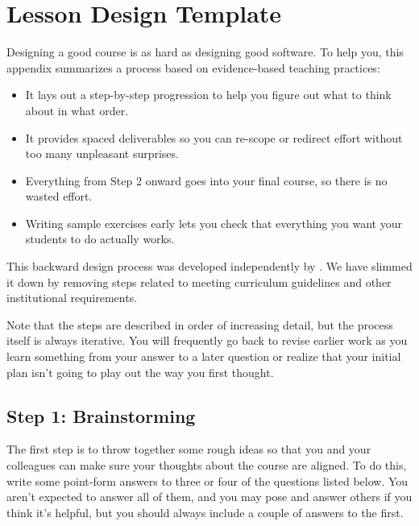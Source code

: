 \chapter{Lesson Design Template}\label{s:template}

Designing a good course is as hard as designing good software. To help
you, this appendix summarizes a process based on evidence-based teaching
practices:

\begin{itemize}

\item
  It lays out a step-by-step progression to help you figure out what to
  think about in what order.

\item
  It provides spaced deliverables so you can re-scope or redirect
  effort without too many unpleasant surprises.

\item
  Everything from Step 2 onward goes into your final course, so there is
  no wasted effort.

\item
  Writing sample exercises early lets you check that everything you want
  your students to do actually works.

\end{itemize}

This backward design process was developed independently by
\cite{Wigg2005,Bigg2011,Fink2013}. We have slimmed it down by
removing steps related to meeting curriculum guidelines and other
institutional requirements.

Note that the steps are described in order of increasing detail, but
the process itself is always iterative. You will frequently go back to
revise earlier work as you learn something from your answer to a later
question or realize that your initial plan isn't going to play out the
way you first thought.

\section*{Step 1: Brainstorming}

The first step is to throw together some rough ideas so that you and
your colleagues can make sure your thoughts about the course are
aligned. To do this, write some point-form answers to three or four of
the questions listed below. You aren't expected to answer all of them,
and you may pose and answer others if you think it's helpful, but you
should always include a couple of answers to the first.

